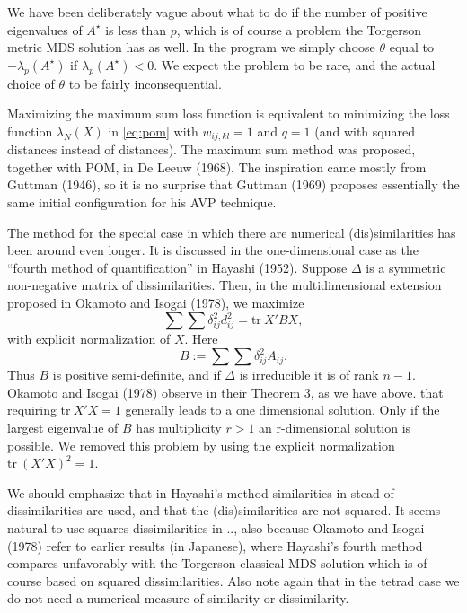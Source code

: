 \documentclass[
  12pt,
]{article}
\begin{document}
We have been deliberately vague about what to do if the number of
positive eigenvalues of \(A^\star\) is less than \(p\), which is of
course a problem the Torgerson metric MDS solution has as well. In the
program we simply choose \(\theta\) equal to \(-\lambda_p(A^\star)\)
if \(\lambda_p(A^\star)<0\). We expect the problem to be rare, and
the actual choice of \(\theta\) to be fairly inconsequential.

Maximizing the maximum sum loss function is equivalent to minimizing
the loss function \(\lambda_N(X)\) in \eqref{eq:pom} with \(w_{ij,kl}=1\)
and \(q=1\) (and with squared distances instead of distances). The
maximum sum method was proposed, together with POM, in De Leeuw (1968).
The inspiration came mostly from Guttman (1946), so it is no surprise that
Guttman (1969) proposes essentially the same initial configuration for his
AVP technique.

The method for the special case in which there are numerical (dis)similarities
has been around even longer. It is discussed
in the one-dimensional case as the ``fourth method of quantification''
in Hayashi (1952). Suppose \(\Delta\) is a symmetric non-negative matrix of
dissimilarities. Then, in the multidimensional extension proposed in
Okamoto and Isogai (1978), we maximize
\begin{equation}
\sum\sum\delta_{ij}^2d_{ij}^2=\text{tr}\ X'BX,
\label{eq:hayashi}
\end{equation}
with explicit normalization of \(X\). Here
\begin{equation}
B:=\sum\sum\delta_{ij}^2 A_{ij}.
\label{eq:bmatdef}
\end{equation}
Thus \(B\) is positive semi-definite, and if \(\Delta\) is irreducible it is
of rank \(n-1\). Okamoto and Isogai (1978) observe in their
Theorem 3, as we have above. that
requiring \(\text{tr}\ X'X=1\) generally leads to a one dimensional solution.
Only if the largest eigenvalue of \(B\) has multiplicity \(r>1\) an r-dimensional
solution is possible. We removed this problem by using the explicit normalization
\(\text{tr}\ (X'X)^2=1\).

We should emphasize that in Hayashi's method similarities
in stead of dissimilarities are used, and that the (dis)similarities are
not squared. It seems natural to use squares dissimilarities in .., also because
Okamoto and Isogai (1978) refer to earlier results (in Japanese), where Hayashi's fourth method compares unfavorably with the Torgerson classical MDS solution which is of course based on squared dissimilarities. Also note again that in the tetrad case we
do not need a numerical measure of similarity or dissimilarity.
\end{document}
